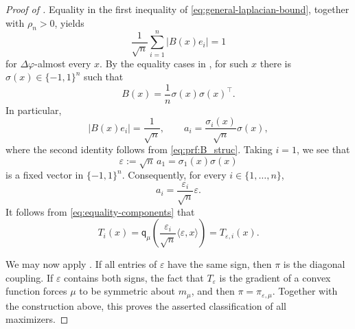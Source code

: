 \documentclass[10pt,a4paper]{amsart}
\newcommand{\qmu}{\mathsf q_{\mu}}
\begin{document}
\begin{proof}[Proof of ]
Equality in the first inequality of
\eqref{eq:general-laplacian-bound}, together with $\rho_n>0$, yields
\[
  \frac1{\sqrt n}\sum_{i=1}^n|B(x)e_i|=1
\]
for $\Delta\varphi$-almost every $x$. By the equality cases in
, for such $x$ there is
$\sigma(x)\in\{-1,1\}^n$ such that
\[
  B(x)=\frac1n\sigma(x)\sigma(x)^\top.
\]
In particular,
\[
  |B(x)e_i|=\frac1{\sqrt n},
  \qquad
  a_i=\frac{\sigma_i(x)}{\sqrt n}\sigma(x),
\]
where the second identity follows from \eqref{eq:prf:B_struc}.
Taking $i=1$, we see that
\[
  \varepsilon:=\sqrt n\,a_1=\sigma_1(x)\sigma(x)
\]
is a fixed vector in $\{-1,1\}^n$. Consequently, for every $i\in\{1,\ldots,n\}$, 
\[
  a_i=\frac{\varepsilon_i}{\sqrt n}\varepsilon.
\]
It follows from \eqref{eq:equality-components} that
\[
  T_i(x)
  =
  \qmu\left(
    \frac{\varepsilon_i}{\sqrt n}
    \langle\varepsilon,x\rangle
  \right)
  =
  T_{\varepsilon,i}(x).
\]

We may now apply . If all entries of
$\varepsilon$ have the same sign, then $\pi$ is the diagonal
coupling. If $\varepsilon$ contains both signs, the fact that
$T_\varepsilon$ is the gradient of a convex function forces $\mu$ to
be symmetric about $m_\mu$, and then
$\pi=\pi_{\varepsilon,\mu}$. Together with the construction above,
this proves the asserted classification of all maximizers.
\end{proof}
\end{document}
